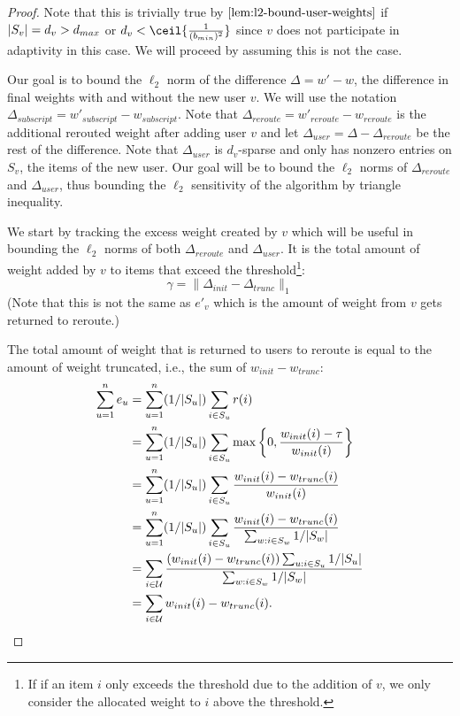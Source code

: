 \begin{proof}
Note that this is trivially true by $\cref{lem:l2-bound-user-weights}$ if $|S_v| = d_v > d_{max}$ or $d_v < \ceil{\frac{1}{(\bmin)^2}}$ since $v$ does not participate in adaptivity in this case.
We will proceed by assuming this is not the case.

Our goal is to bound the $\ell_2$ norm of the difference $\Delta = w' - w$, the difference in final weights with and without the new user $v$. We will use the notation $\Delta_{subscript} = w'_{subscript} - w_{subscript}$.
Note that $\Delta_{reroute} = w'_{reroute} - w_{reroute}$ is the additional rerouted weight after adding user $v$ and let $\Delta_{user} = \Delta - \Delta_{reroute}$ be the rest of the difference.
Note that $\Delta_{user}$ is $d_v$-sparse and only has nonzero entries on $S_v$, the items of the new user.
Our goal will be to bound the $\ell_2$ norms of $\Delta_{reroute}$ and $\Delta_{user}$, thus bounding the $\ell_2$ sensitivity of the algorithm by triangle inequality.

We start by tracking the excess weight created by $v$ which will be useful in bounding the $\ell_2$ norms of both $\Delta_{reroute}$ and $\Delta_{user}$.
It is the total amount of weight added by $v$ to items that exceed the threshold\footnote{If if an item $i$ only exceeds the threshold due to the addition of $v$, we only consider the allocated weight to $i$ above the threshold. }:
\begin{equation}\label{eq:excess}
    \gamma = \|\Delta_{init} - \Delta_{trunc}\|_1
\end{equation}
(Note that this is not the same as $e'_v$ which is the amount of weight from $v$ gets returned to reroute.)

The total amount of weight that is returned to users to reroute is equal to the amount of weight truncated, i.e., the sum of $w_{init} - w_{trunc}$:
\begin{align*}
    \sum_{u=1}^n e_u &= \sum_{u=1}^n (1/|S_u|) \sum_{i \in S_u} r(i) \\
    &= \sum_{u=1}^n (1/|S_u|) \sum_{i \in S_u} \max\left\{0, \frac{w_{init}(i) - \tau}{w_{init}(i)}\right\} \\
    &= \sum_{u=1}^n (1/|S_u|) \sum_{i \in S_u} \frac{w_{init}(i) - w_{trunc}(i)}{w_{init}(i)} \\
    &= \sum_{u=1}^n (1/|S_u|) \sum_{i \in S_u} \frac{w_{init}(i) - w_{trunc}(i)}{\sum_{w : i \in S_w} 1/|S_w|} \\
    &= \sum_{i \in \mathcal{U}} \frac{(w_{init}(i) - w_{trunc}(i)) \sum_{u: i \in S_u} 1/|S_u|}{\sum_{w : i \in S_w} 1/|S_w|} \\
    &= \sum_{i \in \mathcal{U}} w_{init}(i) - w_{trunc}(i).
\end{align*}


\end{proof}
